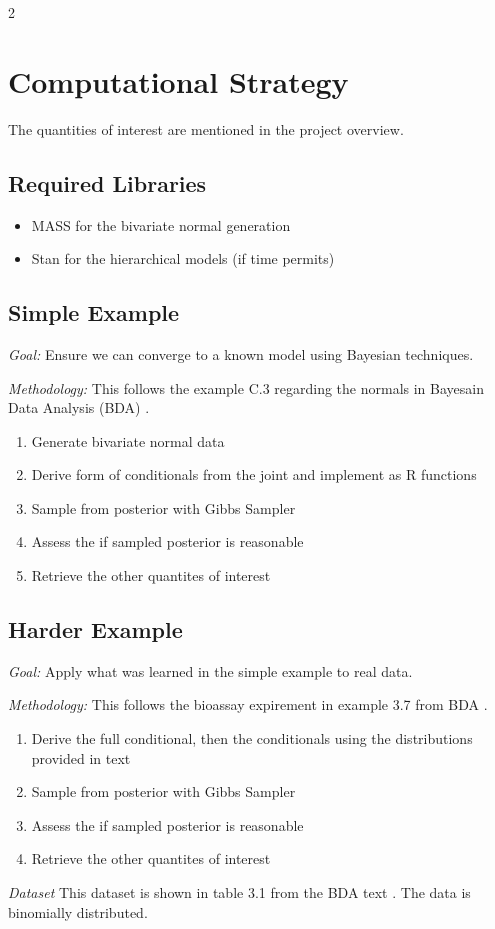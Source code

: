 \documentclass[10pt]{article}
\begin{document}
\begin{multicols*}{2}
\section{Computational Strategy}
The quantities of interest are mentioned in the project overview.
\subsection{Required Libraries}
\begin{itemize}[nosep]
	\item MASS  for the bivariate normal generation \cite{ripley_mass_2009}
	\item Stan for the hierarchical models (if time permits) \cite{guo_rstan_2015}
\end{itemize}
\subsection{Simple Example}
\textit{Goal: }Ensure we can converge to a known model using Bayesian techniques.

\noindent\textit{Methodology: } This follows the example C.3 regarding the normals in Bayesain Data Analysis (BDA) \cite{gelman_bayesian_2014}.
\begin{enumerate}[nosep]
	\item Generate bivariate normal data
	\item Derive form of conditionals from the joint and implement as R functions
	\item Sample from posterior with Gibbs Sampler
	\item Assess the if sampled posterior is reasonable
	\item Retrieve the other quantites of interest 
\end{enumerate}
\subsection{Harder Example}
\textit{Goal: }Apply what was learned in the simple example to real data.

\noindent\textit{Methodology: }This follows the bioassay expirement in example 3.7 from BDA \cite{gelman_bayesian_2014}. 
\begin{enumerate}[nosep]
	\item Derive the full conditional, then the conditionals using the distributions provided in text
	\item Sample from posterior with Gibbs Sampler
	\item Assess the if sampled posterior is reasonable
	\item Retrieve the other quantites of interest
\end{enumerate}
\noindent\textit{Dataset}
This dataset is shown in table 3.1 from the BDA text \cite{gelman_bayesian_2014}. 
The data is binomially distributed.

\end{multicols*}
\end{document}
